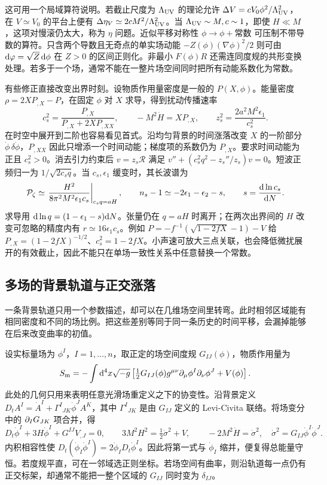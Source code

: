 这可用一个局域算符说明。若截止尺度为 $\Lambda_{\rm UV}$ 的理论允许 $\Delta V=c V_0\phi^2/\Lambda_{\rm UV}^2$，在 $V\simeq V_0$ 的平台上便有 $\Delta\eta_V\simeq2cM^2/\Lambda_{\rm UV}^2$。当 $\Lambda_{\rm UV}\sim M,c\sim1$，即使 $H\ll M$，这项对慢滚仍太大，称为 $\eta$ 问题。近似平移对称性 $\phi\to\phi+\text{常数}$ 可压制不带导数的算符。只含两个导数且无奇点的单实场动能 $-Z(\phi)(\nabla\phi)^2/2$ 则可由 $\dd\varphi=\sqrt{Z}\,\dd\phi$ 在 $Z>0$ 的区间正则化。非最小 $F(\phi)R$ 还需连同度规的共形变换处理。若多于一个场，通常不能在一整片场空间同时把所有动能系数化为常数。

有些修正直接改变出界时刻。设物质作用量密度是一般的 $P(X,\phi)$。能量密度 $\rho=2XP_{,X}-P$，在固定 $\phi$ 对 $X$ 求导，得到扰动传播速率
\[
 c_s^2=\frac{P_{,X}}{P_{,X}+2XP_{,XX}},\qquad
 -M^2\dot H=XP_{,X},\qquad
 z_s^2=\frac{2a^2M^2\epsilon_1}{c_s^2}.
\]
在时空中展开到二阶也容易看见首式。沿均匀背景的时间涨落改变 $X$ 的一阶部分 $\dot\phi\,\delta\dot\phi$，$P_{,XX}$ 因此只增添一个时间动能；梯度项的系数仍为 $P_{,X}$。要求时间动能为正且 $c_s^2>0$。消去引力约束后 $v=z_s\mathcal R$ 满足 $v''+(c_s^2 q^2-z_s''/z_s)v=0$。短波正频归一为 $1/\sqrt{2c_sq}$。当 $c_s,\epsilon_1$ 缓变时，其长波谱为
\[
 \mathcal P_\zeta\simeq\left.\frac{H^2}{8\pi^2M^2\epsilon_1 c_s}
 \right|_{c_s q=aH},\qquad
 n_s-1\simeq-2\epsilon_1-\epsilon_2-s,\qquad s=\frac{\dd\ln c_s}{\dd N}.
\]
求导用 $\dd\ln q=(1-\epsilon_1-s)\dd N$。张量仍在 $q=aH$ 时离开；在两次出界间的 $H$ 改变可忽略的精度内有 $r\simeq16\epsilon_1 c_s$。例如 $P=-f^{-1}(\sqrt{1-2fX}-1)-V$ 给 $P_{,X}=(1-2fX)^{-1/2}$、$c_s^2=1-2fX$。小声速可放大三点关联，也会降低微扰展开的有效截止，因此不能只在单场一致性关系中任意替换一个常数。

\subsection{多场的背景轨道与正交涨落}\label{sec:cosmo-inf-multifield}

一条背景轨道只用一个参数描述，却可以在几维场空间里转弯。此时相邻区域能有相同密度和不同的场比例。把这些差别等同于同一条历史的时间平移，会漏掉能够在后来改变曲率的初值。

设实标量场为 $\phi^I$，$I=1,\ldots,n$，取正定的场空间度规 $G_{IJ}(\phi)$，物质作用量为
\[
 S_{\rm m}=-\int\dd^4x\sqrt{-g}
 \left[\tfrac12G_{IJ}(\phi)g^{\mu\nu}\partial_\mu\phi^I\partial_\nu\phi^J+V(\phi)\right].
\]
此处的几何只用来表明任意光滑场重定义之下的协变性。沿背景定义 $D_t A^I=\dot A^I+\Gamma^I{}_{JK}\dot\phi^J A^K$，其中 $\Gamma^I{}_{JK}$ 是由 $G_{IJ}$ 定义的 Levi-Civita 联络。将场变分中的 $\partial_I G_{JK}$ 项合并，得
\begin{equation}\label{eq:cosmo-inf-multi-bg}
 D_t\dot\phi^I+3H\dot\phi^I+G^{IJ}V_{,J}=0,\qquad
 3M^2H^2=\tfrac12\dot\sigma^2+V,\qquad
 -2M^2\dot H=\dot\sigma^2,\quad
 \dot\sigma^2=G_{IJ}\dot\phi^I\dot\phi^J .
\end{equation}
内积相容性使 $D_t(\dot\phi_I\dot\phi^I)=2\dot\phi_I D_t\dot\phi^I$。因此将第一式与 $\dot\phi_I$ 缩并，便复得总能量守恒。若度规平直，可在一邻域选正则坐标。若场空间有曲率，则沿轨道每一点仍有正交标架，却通常不能把一整个区域的 $G_{IJ}$ 同时变为 $\delta_{IJ}$。


